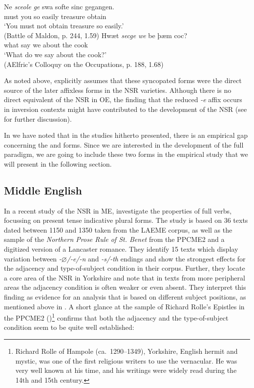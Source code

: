 \documentclass[output=paper]{langsci/langscibook}
\begin{document}
\ea
\ea\label{exwege2}
\gll Ne \textit{sceole} \textit{ge} swa softe sinc gegangen.\\
\Neg{} must you so easily treasure obtain\\
\glt `You must not obtain treasure so easily.'\\
(Battle of Maldon, p. 244, 1.59)
\ex
\gll Hwæt \textit{secge} \textit{we} be  þæm coc?\\
what say we about the cook\\
\glt `What do we say about the cook?'\\
(AElfric's Colloquy on the Occupations, p. 188, 1.68)
\z
\z

As noted above, \citet{Rodeffer:1903} explicitly assumes that these syncopated
forms were the direct source of the later affixless forms in the \gls{NSR}
varieties. Although there is no direct equivalent of the \gls{NSR} in \gls{OE},
the finding that the reduced \emph{-e} affix occurs in inversion contexts might
have contributed to the development of the \gls{NSR} (see
 for further discussion).

In  we have noted that in the studies hitherto presented, there
is an empirical gap concerning the \Fsg{} and \Ssg{} forms.  Since we are
interested in the development of the full paradigm, we are going to include
these two forms in the empirical study that we will present in the following
section.

\subsection{Middle English}
\label{sec:me}

In a recent study of the \gls{NSR} in ME, \cite{deHaasandvanKemenade:2015}
investigate the  properties of full verbs, focussing on present tense
indicative plural forms. The study is based on 36 texts dated between 1150 and
1350 taken from the \nocite{LAEME} LAEME corpus, as well as the sample of the
\emph{Northern Prose Rule of St. Benet} from the PPCME2 and a digitized version
of a Lancaster romance. They identify 15 texts which display variation between
\emph{-$\varnothing$/-e/-n} and \emph{-s/-th} endings and show the strongest effects for
the adjacency and type-of-subject condition in their corpus. Further, they
locate a core area of the \gls{NSR} in Yorkshire and note that in texts from
more peripheral areas the adjacency condition is often weaker or even absent.
They interpret this finding as evidence for an analysis that is based on
different subject positions, as mentioned above in . A
short glance at the sample of Richard Rolle's Epistles in the PPCME2
(\citealt{KroTay2000})\footnote{Richard Rolle of Hampole (ca.\ 1290--1349),
    Yorkshire, English hermit and mystic, was one of the first religious writers to
    use the vernacular. He was very well known at his time, and his writings were
widely read during the 14th and 15th century.} confirms that both the adjacency
and the type-of-subject condition seem to be quite well established:
\end{document}
